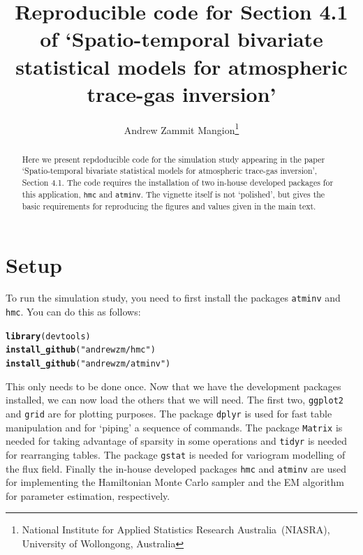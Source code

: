 \documentclass[a4paper,11pt]{article}\usepackage[]{graphicx}\usepackage[]{color}
\makeatletter
\newcommand{\hlstr}[1]{\textcolor[rgb]{0.192,0.494,0.8}{#1}}%
\newcommand{\hlstd}[1]{\textcolor[rgb]{0.345,0.345,0.345}{#1}}%
\newcommand{\hlkwd}[1]{\textcolor[rgb]{0.737,0.353,0.396}{\textbf{#1}}}%
\newenvironment{kframe}{%
 \def\at@end@of@kframe{}%
 \ifinner\ifhmode%
  \def\at@end@of@kframe{\end{minipage}}%
  \begin{minipage}{\columnwidth}%
 \fi\fi%
 \def\FrameCommand##1{\hskip\@totalleftmargin \hskip-\fboxsep
 \colorbox{shadecolor}{##1}\hskip-\fboxsep
     \hskip-\linewidth \hskip-\@totalleftmargin \hskip\columnwidth}%
 \MakeFramed {\advance\hsize-\width
   \@totalleftmargin\z@ \linewidth\hsize
   \@setminipage}}%
 {\par\unskip\endMakeFramed%
 \at@end@of@kframe}
\newenvironment{knitrout}{}{} %
\makeatother
\begin{document}
\title{Reproducible code for Section 4.1 of `Spatio-temporal bivariate statistical models for atmospheric trace-gas inversion'}

\author{Andrew Zammit Mangion\footnote{National Institute for Applied Statistics Research Australia~(NIASRA), University of Wollongong, Australia}}                                                           

\maketitle

\begin{abstract}
Here we present repdoducible code for the simulation study appearing in the paper `Spatio-temporal bivariate statistical models for atmospheric trace-gas inversion', Section 4.1. The code requires the installation of two in-house developed packages for this application, \texttt{hmc} and \texttt{atminv}. The vignette itself is not `polished', but gives the basic requirements for reproducing the figures and values given in the main text.

\end{abstract}

\section{Setup}

To run the simulation study, you need to first install the packages \texttt{atminv} and \texttt{hmc}. You can do this as follows:

\begin{knitrout}
\color{fgcolor}\begin{kframe}
\begin{alltt}
\hlkwd{library}\hlstd{(devtools)}
\hlkwd{install_github}\hlstd{(}\hlstr{"andrewzm/hmc"}\hlstd{)}
\hlkwd{install_github}\hlstd{(}\hlstr{"andrewzm/atminv"}\hlstd{)}
\end{alltt}
\end{kframe}
\end{knitrout}

This only needs to be done once. Now that we have the development packages installed, we can now load the others that we will need. The first two, \texttt{ggplot2} and \texttt{grid} are for plotting purposes. The package \texttt{dplyr} is used for fast table manipulation and for `piping' a sequence of commands. The package \texttt{Matrix} is needed for taking advantage of sparsity in some operations and \texttt{tidyr} is needed for rearranging tables. The package \texttt{gstat} is needed for variogram modelling of the flux field. Finally the in-house developed packages \texttt{hmc} and \texttt{atminv} are used for implementing the Hamiltonian Monte Carlo sampler and the EM algorithm for parameter estimation, respectively.
\end{document}
